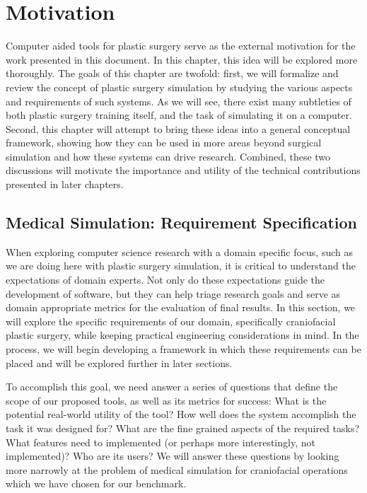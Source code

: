 
\chapter{Motivation}
\label{chp:motivation}

Computer aided tools for plastic surgery serve as the external
motivation for the work presented in this document. In this chapter,
this idea will be explored more thoroughly. The goals of this chapter
are twofold: first, we will formalize and review the concept of
plastic surgery simulation by studying the various aspects and
requirements of such systems. As we will see, there exist many
subtleties of both plastic surgery training itself, and the task of
simulating it on a computer. Second, this chapter will attempt to
bring these ideas into a general conceptual framework, showing how
they can be used in more areas beyond surgical simulation and how
these systems can drive research. Combined, these two discussions will
motivate the importance and utility of the technical contributions
presented in later chapters.

\section{Medical Simulation: Requirement Specification}

When exploring computer science research with a domain specific focus,
such as we are doing here with plastic surgery simulation, it is
critical to understand the expectations of domain experts. Not only do
these expectations guide the development of software, but they can
help triage research goals and serve as domain appropriate metrics for
the evaluation of final results. In this section, we will explore the
specific requirements of our domain, specifically craniofacial plastic
surgery, while keeping practical engineering considerations in
mind. In the process, we will begin developing a framework in
which these requirements can be placed and will be explored further in
later sections.

To accomplish this goal, we need answer a series of questions that
define the scope of our proposed tools, as well as its metrics for
success: What is the potential real-world utility of the tool? How
well does the system accomplish the task it was designed for?  What
are the fine grained aspects of the required tasks? What features need
to implemented (or perhaps more interestingly, not implemented)? Who
are its users? We will answer these questions by looking more narrowly
at the problem of medical simulation for craniofacial operations which
we have chosen for our benchmark.

